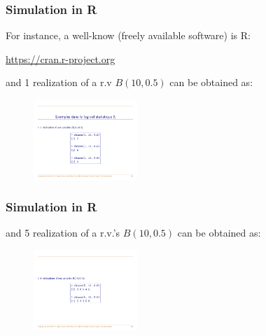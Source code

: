 \documentclass[notes=show,smaller,handout]{beamer}
\begin{document}
\begin{frame}
\frametitle{Simulation in R}

For instance, a well-know (freely available software) is R:

\begin{center}
\url{https://cran.r-project.org}	
\end{center}


\medskip

and 1 realization of a r.v  $B(10, 0.5)$ can be obtained as:

\medskip

\begin{center} %
\begin{figure}[ptb]\centering
\includegraphics[width=0.35\textwidth,height=0.35\textheight]{sim1.pdf}
\end{figure}

\end{center}
\end{frame}



\begin{frame}
\frametitle{Simulation in R}


and 5 realization of a r.v.'s  $B(10, 0.5)$ can be obtained as:

\medskip

\begin{center} %
\begin{figure}[ptb]\centering
\includegraphics[width=0.35\textwidth,height=0.3\textheight]{sim2.pdf}
\end{figure}

\end{center}
\end{frame}
\end{document}
